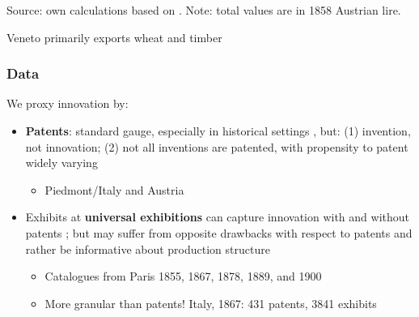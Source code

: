 \documentclass[10pt]{beamer}
\begin{document}
\begin{frame}[label = trade_products]
\begin{table}[htbp]
    Source: own calculations based on \cite[][Tabb. VII, XIII and XIV]{glazier1966}. Note: total values are in 1858 Austrian lire.

\end{table}%

Veneto primarily exports wheat and timber   \\

\hyperlink{trade_origins_destinations}{}  

\end{frame}

\begin{frame}
    \frametitle{Data}
    
    We proxy innovation by:

    \begin{itemize}
        \item \textbf{Patents}: standard gauge, especially in historical settings \citep{streb2023}, but: (1) invention, not innovation; (2) not all inventions are patented, with propensity to patent widely varying \citep{griliches1990, nagaoka2010}
        
        \begin{itemize}
            \item Piedmont/Italy and Austria
        \end{itemize}

        \pause
        
        \item Exhibits at \textbf{universal exhibitions} can capture innovation with and without patents \citep{moser2005, moser2012}; but may suffer from opposite drawbacks with respect to patents and rather be informative about production structure \citep{domini2019, domini2022}
         
        \begin{itemize}
            \item Catalogues from Paris 1855, 1867, 1878, 1889, and 1900
            \item More granular than patents! Italy, 1867: 431 patents, 3841 exhibits 
        \end{itemize}

    \end{itemize}

    
\end{frame}
\end{document}
